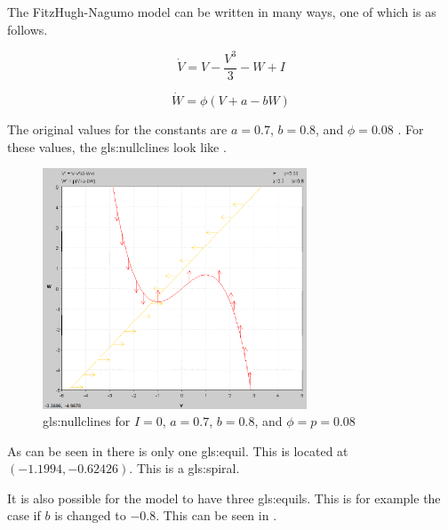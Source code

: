 \documentclass[class={myRUCProject}, crop=false]{standalone}
\begin{document}
The FitzHugh-Nagumo model can be written in many ways, one of which is as follows.

\begin{equation}
    \dot{V}=V-\frac{V^{3}}{3} - W + I 
\end{equation}

\begin{equation}
    \dot{W}=\phi (V+a-bW)
\end{equation}

The original values for the constants are \(a=0.7\), \(b=0.8\), and \(\phi=0.08\) \cite{Sherwood2013}. For these values, the \glspl{gls:nullcline} look like . 

\begin{figure}[ht]
    \centering
    \includegraphics[width=0.7\textwidth]{Pictures/Alex/Nullclines - original.PNG}
    \caption{\Glspl{gls:nullcline} for \(I=0\), \(a=0.7\), \(b=0.8\), and \(\phi=p=0.08\)}
    \label{fig:nullclines-original}
\end{figure}

As can be seen in  there is only one \gls{gls:equil}. This is located at \((-1.1994, -0.62426)\). This is a \gls{gls:spiral}. 

It is also possible for the model to have three \glspl{gls:equil}. This is for example the case if \(b\) is changed to \(-0.8\). This can be seen in .
\end{document}

